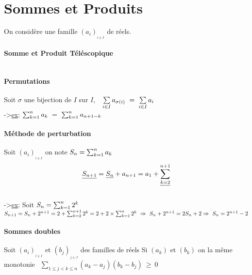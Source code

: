 

\minitoc
	\section{Sommes et Produits}
		On considère une famille $(a_i)_{_{i\in I}}$ de réels.
 
 \paragraph{Somme et Produit Téléscopique} 
 ${}$ 
 
 \paragraph{Permutations}
 Soit $\sigma$ une bijection de $I$ sur $I$, 
 $~~\sum\limits_{i\in I} a_{\sigma (i)} ~=~ \sum\limits_{i\in I} a_i$ \\
 ->\underline{ex}: \hspace*{25pt} $\sum_{k= 1 }^{n} a_k ~=~ \sum_{k= 1 }^{n} a_{n+1-k}$
 
 \paragraph{Méthode de perturbation}
 Soit $(a_i)_{_{i\in I}}$ on note $S_n = \sum_{k= 1 }^{n} a_k$\\
 \[\underline{S_{n+1}} = \underline{S_n} + a_{n+1} = a_1 + \underline{\sum_{k= 2 }^{n+1}}\]\\
 ->\underline{ex}:\hspace*{25pt} Soit $S_n = \sum_{k= 1 }^{n} 2^k$ \\
 $S_{n+1} = S_n + 2^{n+1} = 2 + \sum_{k= 2 }^{n+1} 2^k = 2 + 2\times\sum_{k= 1 }^{n} 2^k ~ \Rightarrow ~ S_n + 2^{n+1} = 2S_n + 2 \\\Rightarrow ~S_n = 2^{n+1} - 2$
 
 \paragraph{Sommes doubles}
 
 Soit $(a_i)_{_{i\in I}}$ et $(b_j)_{_{j\in J}}$ des familles de réels 
 Si $(a_k)$ et $(b_k)$ on la même monotonie $~~\sum\limits_{1\leq j<k\leq n} (a_k - a_j )( b_k - b_j) ~\geq ~0$
 
